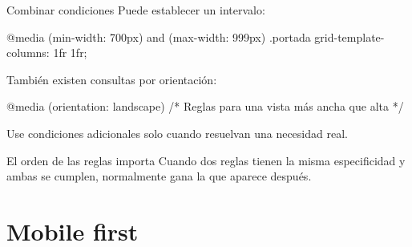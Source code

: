 \documentclass[aspectratio=169,11pt]{beamer}
\begin{document}
    \begin{frame}[fragile]{Combinar condiciones}
        Puede establecer un intervalo:

        \begin{csscodedark}
            @media (min-width: 700px) and (max-width: 999px) {
                .portada {
                    grid-template-columns: 1fr 1fr;
                }
            }
        \end{csscodedark}

        También existen consultas por orientación:

        \begin{csscodedark}
            @media (orientation: landscape) {
                /* Reglas para una vista más ancha que alta */
            }
        \end{csscodedark}

        Use condiciones adicionales solo cuando resuelvan una necesidad real.
    \end{frame}

    \begin{frame}{El orden de las reglas importa}
        Cuando dos reglas tienen la misma especificidad y ambas se cumplen,
        normalmente gana la que aparece después.

        \begin{center}
        \end{center}
    \end{frame}

    \section{Mobile first}
\end{document}
